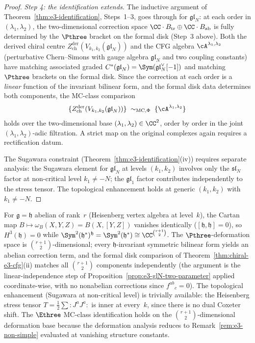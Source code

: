 \begin{proof}
\smallskip
\noindent\textit{Step 4: the identification extends.}
The inductive argument of
Theorem~\ref{thm:e3-identification}, Steps~1--3,
goes through for $\mathfrak{gl}_N$: at each order
in $(\lambda_1, \lambda_2)$, the two-dimensional
correction space $\CC \cdot B_{\mathrm{tr}} \oplus
\CC \cdot B_{\mathrm{ab}}$ is fully determined by the
$\Pthree$ bracket on the formal disk
(Step~3 above). Both the derived chiral centre
$Z^{\mathrm{der}}_{\mathrm{ch}}
(V_{k_1,k_2}(\mathfrak{gl}_N))$ and the CFG algebra
$\cA^{\lambda_1, \lambda_2}$ (perturbative Chern--Simons
with gauge algebra $\mathfrak{gl}_N$ and two coupling
constants) have matching associated graded
$C^*(\mathfrak{gl}_N) =
\Sym(\mathfrak{gl}_N^\vee[-1])$ and matching
$\Pthree$ brackets on the formal disk.
Since the correction at each order is a
\emph{linear} function of the invariant bilinear form,
and the formal disk data determines both components,
the MC-class comparison
\[
 \{Z^{\mathrm{der}}_{\mathrm{ch}}
 (V_{k_1,k_2}(\mathfrak{gl}_N))\}
 \;\sim_{\mathrm{MC},\Phi}\;
 \{\cA^{\lambda_1, \lambda_2}\}
\]
holds over the two-dimensional base
$(\lambda_1, \lambda_2) \in \CC^2$, order by order in
the joint $(\lambda_1, \lambda_2)$-adic filtration. A strict map on
the original complexes again requires a rectification datum.

The Sugawara constraint
(Theorem~\ref{thm:e3-identification}(iv)) requires
separate analysis: the Sugawara element for
$\mathfrak{gl}_N$ at levels $(k_1, k_2)$ involves only
the $\mathfrak{sl}_N$ factor at non-critical level
$k_1 \neq -N$; the $\mathfrak{gl}_1$ factor contributes
independently to the stress tensor. The topological
enhancement holds at generic $(k_1, k_2)$ with
$k_1 \neq -N$.
\end{proof}

\begin{remark}
\label{rem:e3-heisenberg-endpoint}
For $\mathfrak{g} = \mathfrak{h}$ abelian of rank~$r$
\textup{(}Heisenberg vertex algebra at level~$k$\textup{)},
the Cartan map $B \mapsto \omega_B(X,Y,Z) = B(X,[Y,Z])$
vanishes identically \textup{(}$[\mathfrak{h},\mathfrak{h}]=0$\textup{)},
so $H^3(\mathfrak{h}) = 0$ while
$\Sym^2(\mathfrak{h}^*)^\mathfrak{h} = \Sym^2(\mathfrak{h}^*)
\cong \CC^{\binom{r+1}{2}}$. The $\Pthree$-deformation
space is $\binom{r+1}{2}$-dimensional; every
$\mathfrak{h}$-invariant symmetric bilinear form yields
an abelian correction term, and the formal disk
comparison of Theorem~\ref{thm:chiral-e3-cfg}(ii) matches
all $\binom{r+1}{2}$ components independently
\textup{(}the argument is the linear-independence step
of Proposition~\ref{prop:e3-glN-two-parameter} applied
coordinate-wise, with no nonabelian corrections since
$f^{ab}{}_c = 0$\textup{)}. The topological enhancement
\textup{(}Sugawara at non-critical level\textup{)} is
trivially available: the Heisenberg stress tensor
$T = \tfrac{1}{2}\sum \colon J^a J^a\colon$ is inner at
every~$k$, since there is no dual Coxeter shift. The
$\Ethree$ MC-class identification holds on the
$\binom{r+1}{2}$-dimensional deformation base because the deformation
analysis reduces to Remark~\ref{rem:e3-non-simple}
evaluated at vanishing structure constants.
\end{remark}

